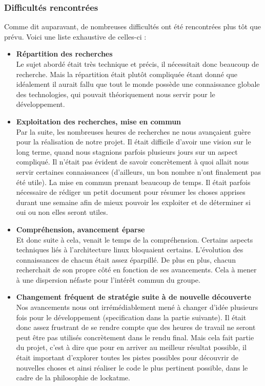 \documentclass[french]{report}
\begin{document}
\subsubsection{Difficultés rencontrées}
Comme dit auparavant, de nombreuses difficultés ont été rencontrées plus tôt que prévu.
Voici une liste exhaustive de celles-ci :

\vspace{0.5cm}
\begin{itemize}[label=\textbullet, font=\normalfont \color{blue}]
  \item{\textbf{Répartition des recherches}}\\
Le sujet abordé était très technique et précis, il nécessitait donc beaucoup de
recherche. Mais la répartition était plutôt compliquée étant donné que idéalement
il aurait fallu que tout le monde possède une connaissance globale des technologies,
qui pouvait théoriquement nous servir pour le développement.\\

  \item{\textbf{Exploitation des recherches, mise en commun}}\\
Par la suite, les nombreuses heures de recherches ne nous avançaient guère pour la
réalisation de notre projet. Il était difficile d'avoir une vision sur le long
terme, quand nous stagnions parfois plusieurs jours sur un aspect compliqué. Il
n'était pas évident de savoir concrètement à quoi allait nous servir certaines
connaissances (d'ailleurs, un bon nombre n'ont finalement pas été utile). La mise
en commun prenant beaucoup de temps. Il était parfois nécessaire de rédiger un
petit document pour résumer les choses apprises durant une semaine afin de mieux
pouvoir les exploiter et de déterminer si oui ou non elles seront utiles.\\

  \item{\textbf{Compréhension, avancement éparse}}\\
Et donc suite à cela, venait le temps de la compréhension. Certains aspects techniques
liés à l'architecture linux bloquaient certains. L'évolution des connaissances de
chacun était assez éparpillé. De plus en plus, chacun recherchait de son propre
côté en fonction de ses avancements. Cela à mener à une dispersion néfaste pour
l'intérêt commun du groupe.\\

  \item{\textbf{Changement fréquent de stratégie suite à de nouvelle découverte}}\\
Nos avancements nous ont irrémédiablement mené à changer d'idée plusieurs fois
pour le développement (specification dans la partie suivante). Il était donc assez
frustrant de se rendre compte que des heures de travail ne seront peut être pas
utilisés concrètement dans le rendu final. Mais cela fait partie du projet,
c'est à dire que pour en arriver au meilleur résultat possible, il était important
d'explorer toutes les pistes possibles pour découvrir de nouvelles choses et ainsi
réaliser le code le plus pertinent possible, dans le cadre de la philosophie de lockatme.\\


\end{itemize}
\end{document}
